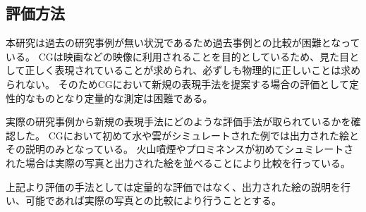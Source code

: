 \subsection{評価方法}
本研究は過去の研究事例が無い状況であるため過去事例との比較が困難となっている。
CGは映画などの映像に利用されることを目的としているため、見た目として正しく表現されていることが求められ、必ずしも物理的に正しいことは求められない。
そのためCGにおいて新規の表現手法を提案する場合の評価として定性的なものとなり定量的な測定は困難である。

実際の研究事例から新規の表現手法にどのような評価手法が取られているかを確認した。
CGにおいて初めて水\cite{Foster1996}や雲\cite{Gardner1985}がシミュレートされた例では出力された絵とその説明のみとなっている。
火山噴煙\cite{Mizuno2003}やプロミネンス\cite{Ishikawa}が初めてシュミレートされた場合は実際の写真と出力された絵を並べることにより比較を行っている。

上記より評価の手法としては定量的な評価ではなく、出力された絵の説明を行い、可能であれば実際の写真との比較により行うこととする。
